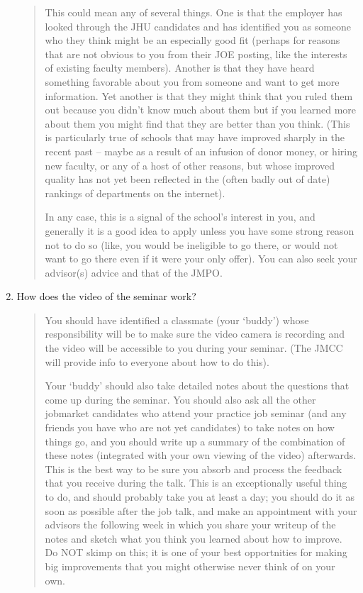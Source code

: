 \documentclass{\classes/econtex}
\begin{document}
\begin{enumerate}
    \begin{quote}
      This could mean any of several things.  One is that the employer has looked through the JHU candidates and has identified you as someone who they think might be an especially good fit (perhaps for reasons that are not obvious to you from their JOE posting, like the interests of existing faculty members).  Another is that they have heard something favorable about you from someone and want to get more information.  Yet another is that they might think that you ruled them out because you didn't know much about them but if you learned more about them you might find that they are better than you think.  (This is particularly true of schools that may have improved sharply in the recent past -- maybe as a result of an infusion of donor money, or hiring new faculty, or any of a host of other reasons, but whose improved quality has not yet been reflected in the (often badly out of date) rankings of departments on the internet).

      In any case, this is a signal of the school's interest in you, and generally it is a good idea to apply unless you have some strong reason not to do so (like, you would be ineligible to go there, or would not want to go there even if it were your only offer).  You can also seek your advisor(s) advice and that of the JMPO.


    \end{quote}
  \item  How does the video of the seminar work?
    
    \begin{quote}
      You should have identified a classmate (your `buddy') whose
      responsibility will be to make sure the video camera is recording
      and the video will be accessible to you during your seminar.  (The
      JMCC will provide info to everyone about how to do this).  

      Your `buddy' should also take detailed notes about the questions
      that come up during the seminar.  You should also ask all the other
      jobmarket candidates who attend your practice job seminar (and any
      friends you have who are not yet candidates) to take notes on how
      things go, and you should write up a summary of the combination of
      these notes (integrated with your own viewing of the video)
      afterwards.  This is the best way to be sure you absorb and process
      the feedback that you receive during the talk.  This is an
      exceptionally useful thing to do, and should probably take you at least
      a day; you should do it as soon as possible after the job talk, and
      make an appointment with your advisors the following week in which
      you share your writeup of the notes and sketch what you think you
      learned about how to improve.  Do NOT skimp on this; it is one of
      your best opportnities for making big improvements that you might
      otherwise never think of on your own.


\end{quote}
\end{enumerate}
\end{document}
